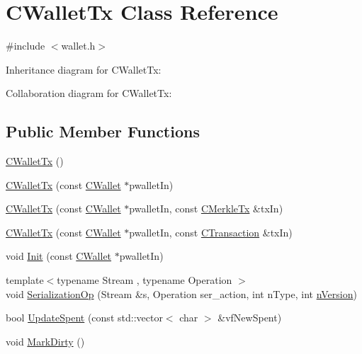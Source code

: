 \hypertarget{class_c_wallet_tx}{}\section{C\+Wallet\+Tx Class Reference}
\label{class_c_wallet_tx}


{\ttfamily \#include $<$wallet.\+h$>$}



Inheritance diagram for C\+Wallet\+Tx\+:


Collaboration diagram for C\+Wallet\+Tx\+:
\subsection*{Public Member Functions}
\begin{DoxyCompactItemize}
\item 
\hyperlink{class_c_wallet_tx_a2124bd17388493a5d883a7ab2cc825b0}{C\+Wallet\+Tx} ()
\item 
\hyperlink{class_c_wallet_tx_a0b1a0f58fbe4c65d47136e1a650cee84}{C\+Wallet\+Tx} (const \hyperlink{class_c_wallet}{C\+Wallet} $\ast$pwallet\+In)
\item 
\hyperlink{class_c_wallet_tx_a8e58ffb8a69ea68fc366b8a53ef345ef}{C\+Wallet\+Tx} (const \hyperlink{class_c_wallet}{C\+Wallet} $\ast$pwallet\+In, const \hyperlink{class_c_merkle_tx}{C\+Merkle\+Tx} \&tx\+In)
\item 
\hyperlink{class_c_wallet_tx_a626a5d41502247ea13b0c90694455468}{C\+Wallet\+Tx} (const \hyperlink{class_c_wallet}{C\+Wallet} $\ast$pwallet\+In, const \hyperlink{class_c_transaction}{C\+Transaction} \&tx\+In)
\item 
void \hyperlink{class_c_wallet_tx_ad207b1e6b355946842a126bc14c7e793}{Init} (const \hyperlink{class_c_wallet}{C\+Wallet} $\ast$pwallet\+In)
\item 
{\footnotesize template$<$typename Stream , typename Operation $>$ }\\void \hyperlink{class_c_wallet_tx_a94e65d0105f2a75a627e374b0bbefe06}{Serialization\+Op} (Stream \&s, Operation ser\+\_\+action, int n\+Type, int \hyperlink{class_c_transaction_a6c29bdd822859c7b21b7b6c22dca6825}{n\+Version})
\item 
bool \hyperlink{class_c_wallet_tx_a49a5151af721410bfb3cf84d241e3228}{Update\+Spent} (const std\+::vector$<$ char $>$ \&vf\+New\+Spent)
\item 
void \hyperlink{class_c_wallet_tx_ac8a376bcb955e437489504dc596b43cf}{Mark\+Dirty} ()
\item 

\end{DoxyCompactItemize}

